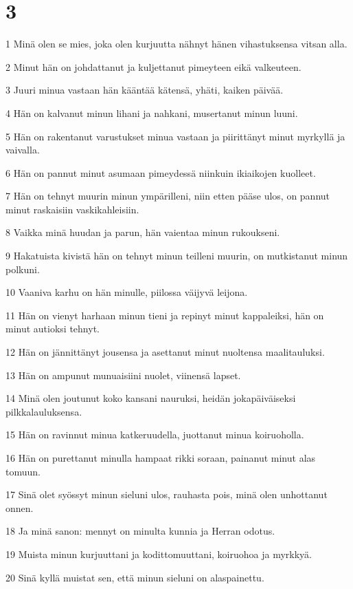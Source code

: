 \chapter{3}

\par 1 Minä olen se mies, joka olen kurjuutta nähnyt hänen vihastuksensa vitsan alla.
\par 2 Minut hän on johdattanut ja kuljettanut pimeyteen eikä valkeuteen.
\par 3 Juuri minua vastaan hän kääntää kätensä, yhäti, kaiken päivää.
\par 4 Hän on kalvanut minun lihani ja nahkani, musertanut minun luuni.
\par 5 Hän on rakentanut varustukset minua vastaan ja piirittänyt minut myrkyllä ja vaivalla.
\par 6 Hän on pannut minut asumaan pimeydessä niinkuin ikiaikojen kuolleet.
\par 7 Hän on tehnyt muurin minun ympärilleni, niin etten pääse ulos, on pannut minut raskaisiin vaskikahleisiin.
\par 8 Vaikka minä huudan ja parun, hän vaientaa minun rukoukseni.
\par 9 Hakatuista kivistä hän on tehnyt minun teilleni muurin, on mutkistanut minun polkuni.
\par 10 Vaaniva karhu on hän minulle, piilossa väijyvä leijona.
\par 11 Hän on vienyt harhaan minun tieni ja repinyt minut kappaleiksi, hän on minut autioksi tehnyt.
\par 12 Hän on jännittänyt jousensa ja asettanut minut nuoltensa maalitauluksi.
\par 13 Hän on ampunut munuaisiini nuolet, viinensä lapset.
\par 14 Minä olen joutunut koko kansani nauruksi, heidän jokapäiväiseksi pilkkalauluksensa.
\par 15 Hän on ravinnut minua katkeruudella, juottanut minua koiruoholla.
\par 16 Hän on purettanut minulla hampaat rikki soraan, painanut minut alas tomuun.
\par 17 Sinä olet syössyt minun sieluni ulos, rauhasta pois, minä olen unhottanut onnen.
\par 18 Ja minä sanon: mennyt on minulta kunnia ja Herran odotus.
\par 19 Muista minun kurjuuttani ja kodittomuuttani, koiruohoa ja myrkkyä.
\par 20 Sinä kyllä muistat sen, että minun sieluni on alaspainettu.
